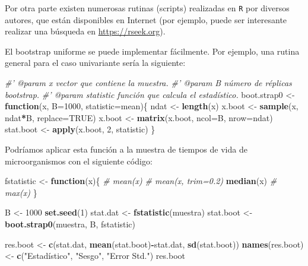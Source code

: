 \documentclass[
]{book}
\newenvironment{Shaded}{\begin{snugshade}}{\end{snugshade}}
\newcommand{\CommentTok}[1]{\textcolor[rgb]{0.56,0.35,0.01}{\textit{#1}}}
\newcommand{\ControlFlowTok}[1]{\textcolor[rgb]{0.13,0.29,0.53}{\textbf{#1}}}
\newcommand{\DataTypeTok}[1]{\textcolor[rgb]{0.13,0.29,0.53}{#1}}
\newcommand{\DecValTok}[1]{\textcolor[rgb]{0.00,0.00,0.81}{#1}}
\newcommand{\KeywordTok}[1]{\textcolor[rgb]{0.13,0.29,0.53}{\textbf{#1}}}
\newcommand{\NormalTok}[1]{#1}
\newcommand{\OperatorTok}[1]{\textcolor[rgb]{0.81,0.36,0.00}{\textbf{#1}}}
\newcommand{\OtherTok}[1]{\textcolor[rgb]{0.56,0.35,0.01}{#1}}
\newcommand{\StringTok}[1]{\textcolor[rgb]{0.31,0.60,0.02}{#1}}
\theoremstyle{definition}
\theoremstyle{definition}
\theoremstyle{definition}
\theoremstyle{remark}
\begin{document}
Por otra parte existen numerosas rutinas (scripts) realizadas en \texttt{R} por
diversos autores, que están disponibles en Internet
(por ejemplo, puede ser interesante realizar una búsqueda en
\url{https://rseek.org}).

El bootstrap uniforme se puede implementar fácilmente. Por ejemplo,
una rutina general para el caso univariante sería la siguiente:

\begin{Shaded}
\begin{Highlighting}[]
\CommentTok{#' @param x vector que contiene la muestra.}
\CommentTok{#' @param B número de réplicas bootstrap.}
\CommentTok{#' @param statistic función que calcula el estadístico.}
\NormalTok{boot.strap0 <-}\StringTok{ }\ControlFlowTok{function}\NormalTok{(x, }\DataTypeTok{B=}\DecValTok{1000}\NormalTok{, }\DataTypeTok{statistic=}\NormalTok{mean)\{}
\NormalTok{  ndat <-}\StringTok{ }\KeywordTok{length}\NormalTok{(x)}
\NormalTok{  x.boot <-}\StringTok{ }\KeywordTok{sample}\NormalTok{(x, ndat}\OperatorTok{*}\NormalTok{B, }\DataTypeTok{replace=}\OtherTok{TRUE}\NormalTok{)}
\NormalTok{  x.boot <-}\StringTok{ }\KeywordTok{matrix}\NormalTok{(x.boot, }\DataTypeTok{ncol=}\NormalTok{B, }\DataTypeTok{nrow=}\NormalTok{ndat)}
\NormalTok{  stat.boot <-}\StringTok{ }\KeywordTok{apply}\NormalTok{(x.boot, }\DecValTok{2}\NormalTok{, statistic)}
\NormalTok{\}}
\end{Highlighting}
\end{Shaded}

Podríamos aplicar esta función a la muestra de tiempos de vida de
microorganismos con el siguiente código:

\begin{Shaded}
\begin{Highlighting}[]
\NormalTok{fstatistic <-}\StringTok{ }\ControlFlowTok{function}\NormalTok{(x)\{}
  \CommentTok{#  mean(x)}
  \CommentTok{#  mean(x, trim=0.2)}
  \KeywordTok{median}\NormalTok{(x)}
  \CommentTok{#  max(x)}
\NormalTok{\}}

\NormalTok{B <-}\StringTok{ }\DecValTok{1000}
\KeywordTok{set.seed}\NormalTok{(}\DecValTok{1}\NormalTok{)}
\NormalTok{stat.dat <-}\StringTok{ }\KeywordTok{fstatistic}\NormalTok{(muestra)}
\NormalTok{stat.boot <-}\StringTok{ }\KeywordTok{boot.strap0}\NormalTok{(muestra, B, fstatistic)}

\NormalTok{res.boot <-}\StringTok{ }\KeywordTok{c}\NormalTok{(stat.dat, }\KeywordTok{mean}\NormalTok{(stat.boot)}\OperatorTok{-}\NormalTok{stat.dat, }\KeywordTok{sd}\NormalTok{(stat.boot))}
\KeywordTok{names}\NormalTok{(res.boot) <-}\StringTok{ }\KeywordTok{c}\NormalTok{(}\StringTok{"Estadístico"}\NormalTok{, }\StringTok{"Sesgo"}\NormalTok{, }\StringTok{"Error Std."}\NormalTok{)}
\NormalTok{res.boot}
\end{Highlighting}
\end{Shaded}
\end{document}
